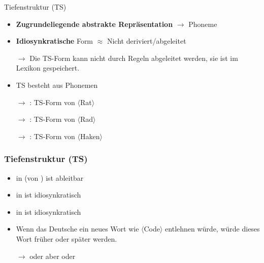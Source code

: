 \begin{frame}{Tiefenstruktur (TS)}
	
\begin{itemize}
	\item \textbf{Zugrundeliegende abstrakte Repräsentation} $\rightarrow$ Phoneme \textipa{/ /}
	\item[]
	\item \textbf{Idiosynkratische} Form $\approx$ Nicht deriviert/abgeleitet
	\item[$\rightarrow$] Die TS-Form kann nicht durch Regeln abgeleitet werden, sie ist im Lexikon gespeichert.
	\item[]
	\item TS besteht aus Phonemen
	\item[$\rightarrow$] : TS-Form von $\langle$Rat$\rangle$\\
	\item[$\rightarrow$] : TS-Form von $\langle$Rad$\rangle$
	\item[$\rightarrow$] : TS-Form von $\langle$Haken$\rangle$
\end{itemize}
		
\end{frame}




\begin{frame}
\frametitle{Tiefenstruktur (TS)}

\begin{itemize}
	\item \textipa{[t]} in \textipa{[\;R a: t]} (von ) ist ableitbar
	\item {} in  ist idiosynkratisch
	\item[]
	\item {} in  ist idiosynkratisch
	\item[]
	\item Wenn das Deutsche ein neues Wort wie $\langle$Code$\rangle$ \textipa{[k @ U d]} entlehnen würde, würde dieses Wort früher oder später  werden.
	\item[$\rightarrow$] \textipa{[k O U t]} oder \textipa{[k o: t]} aber  oder  
\end{itemize}

\end{frame}



